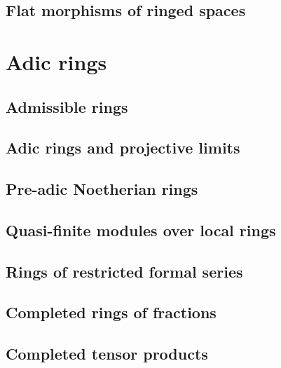 \documentclass[10pt,oneside]{amsart}
\begin{document}
        \subsection{Flat morphisms of ringed spaces}
        

    \section{Adic rings}

        \subsection{Admissible rings}
        

        \subsection{Adic rings and projective limits}
        

        \subsection{Pre-adic Noetherian rings}
        

        \subsection{Quasi-finite modules over local rings}
        

        \subsection{Rings of restricted formal series}
        

        \subsection{Completed rings of fractions}
        

        \subsection{Completed tensor products}
        
\end{document}
